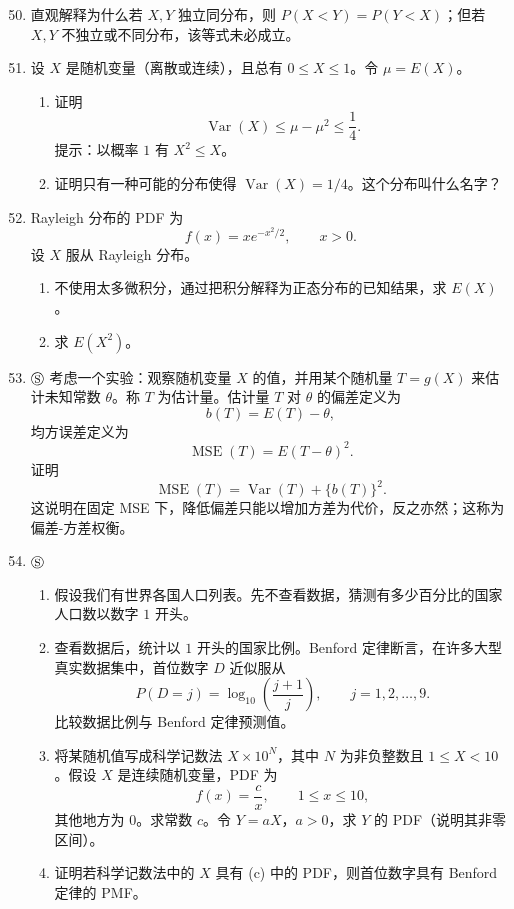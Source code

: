 \documentclass[UTF8,12pt,a4paper,fontset=fandol]{ctexart}
\begin{document}
\begin{enumerate}
  \setcounter{enumi}{49}
  \item 直观解释为什么若 $X,Y$ 独立同分布，则 $P(X<Y)=P(Y<X)$；但若 $X,Y$ 不独立或不同分布，该等式未必成立。

  \item 设 $X$ 是随机变量（离散或连续），且总有 $0\le X\le1$。令 $\mu=E(X)$。
  \begin{enumerate}
    \item 证明
    \[
      \operatorname{Var}(X)\le \mu-\mu^2\le \frac14.
    \]
    提示：以概率 $1$ 有 $X^2\le X$。
    \item 证明只有一种可能的分布使得 $\operatorname{Var}(X)=1/4$。这个分布叫什么名字？
  \end{enumerate}

  \item Rayleigh 分布的 PDF 为
  \[
    f(x)=xe^{-x^2/2},\qquad x>0.
  \]
  设 $X$ 服从 Rayleigh 分布。
  \begin{enumerate}
    \item 不使用太多微积分，通过把积分解释为正态分布的已知结果，求 $E(X)$。
    \item 求 $E(X^2)$。
  \end{enumerate}

  \item $\circledS$ 考虑一个实验：观察随机变量 $X$ 的值，并用某个随机量 $T=g(X)$ 来估计未知常数 $\theta$。称 $T$ 为估计量。估计量 $T$ 对 $\theta$ 的偏差定义为
  \[
    b(T)=E(T)-\theta,
  \]
  均方误差定义为
  \[
    \operatorname{MSE}(T)=E(T-\theta)^2.
  \]
  证明
  \[
    \operatorname{MSE}(T)=\operatorname{Var}(T)+\{b(T)\}^2.
  \]
  这说明在固定 MSE 下，降低偏差只能以增加方差为代价，反之亦然；这称为偏差-方差权衡。

  \item $\circledS$
  \begin{enumerate}
    \item 假设我们有世界各国人口列表。先不查看数据，猜测有多少百分比的国家人口数以数字 $1$ 开头。
    \item 查看数据后，统计以 $1$ 开头的国家比例。Benford 定律断言，在许多大型真实数据集中，首位数字 $D$ 近似服从
    \[
      P(D=j)=\log_{10}\left(\frac{j+1}{j}\right),\qquad j=1,2,\ldots,9.
    \]
    比较数据比例与 Benford 定律预测值。
    \item 将某随机值写成科学记数法 $X\times10^N$，其中 $N$ 为非负整数且 $1\le X<10$。假设 $X$ 是连续随机变量，PDF 为
    \[
      f(x)=\frac{c}{x},\qquad 1\le x\le10,
    \]
    其他地方为 $0$。求常数 $c$。令 $Y=aX$，$a>0$，求 $Y$ 的 PDF（说明其非零区间）。
    \item 证明若科学记数法中的 $X$ 具有 (c) 中的 PDF，则首位数字具有 Benford 定律的 PMF。
  \end{enumerate}


\end{enumerate}
\end{document}
